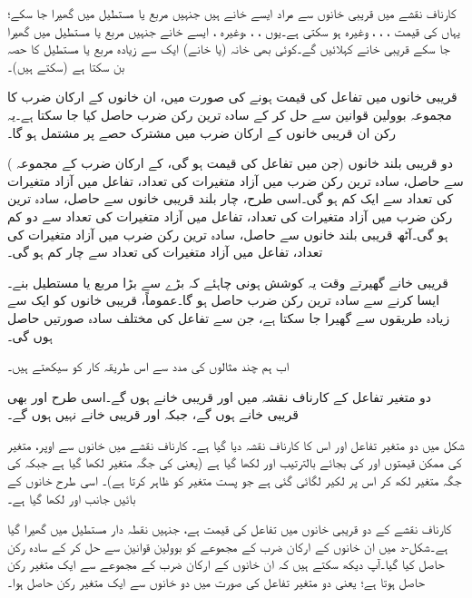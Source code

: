 کارناف نقشے میں قریبی خانوں سے مراد ایسے  خانے ہیں جنہیں مربع یا مستطیل میں گھیرا جا سکے؛ یہاں  کی قیمت ، ، ، وغیرہ ہو سکتی ہے۔یوں ، ، ،وغیرہ ، ایسے خانے جنہیں مربع یا مستطیل میں گھیرا جا سکے قریبی خانے کہلائیں گے۔کوئی بھی خانہ (یا خانے) ایک سے زیادہ مربع یا مستطیل کا حصہ بن سکتا ہے (سکتے ہیں)۔

قریبی خانوں میں تفاعل کی قیمت  ہونے کی صورت میں، ان خانوں کے ارکان ضرب کا مجموعہ بوولین قوانین سے حل کر کے سادہ ترین رکن ضرب حاصل کیا جا سکتا ہے۔یہ رکن ان قریبی خانوں کے ارکان ضرب میں مشترک حصے پر مشتمل ہو گا۔

دو قریبی بلند خانوں (جن میں تفاعل کی قیمت  ہو گی، کے ارکان ضرب کے مجموعہ ) سے حاصل، سادہ ترین رکن ضرب میں آزاد متغیرات کی تعداد، تفاعل میں آزاد متغیرات کی تعداد سے ایک کم ہو گی۔اسی طرح، چار بلند قریبی خانوں سے حاصل، سادہ ترین رکن ضرب میں آزاد متغیرات کی تعداد، تفاعل میں آزاد متغیرات کی تعداد سے دو کم ہو گی۔آٹھ قریبی بلند خانوں سے حاصل، سادہ ترین رکن ضرب میں آزاد متغیرات کی تعداد، تفاعل میں آزاد متغیرات کی تعداد سے چار کم ہو گی۔
	
قریبی خانے گھیرتے وقت یہ کوشش ہونی چاہئے کہ بڑے سے بڑا مربع یا مستطیل بنے۔ایسا کرنے سے سادہ ترین رکن ضرب حاصل ہو گا۔عموماً، قریبی خانوں کو ایک سے زیادہ طریقوں سے گھیرا جا سکتا ہے، جن سے تفاعل کی مختلف سادہ صورتیں حاصل ہوں گی۔
	
اب ہم چند مثالوں کی مدد سے اس طریقہ کار کو سیکھتے ہیں۔
	

دو متغیر تفاعل کے کارناف نقشہ میں  اور  قریبی خانے ہوں گے۔اسی طرح  اور  بھی قریبی خانے ہوں گے، جبکہ  اور  قریبی خانے نہیں ہوں گے۔

شکل  میں دو متغیر تفاعل اور اس کا کارناف نقشہ دیا گیا ہے۔ کارناف نقشے میں خانوں سے اوپر، متغیر  کی ممکن قیمتوں  اور  کی بجائے بالترتیب  اور  لکھا گیا ہے (یعنی  کی جگہ متغیر لکھا گیا ہے جبکہ  کی جگہ متغیر لکھ کر اس پر لکیر لگائی گئی ہے جو پست متغیر کو ظاہر کرتا ہے)۔ اسی طرح خانوں کے بائیں جانب  اور  لکھا گیا ہے۔

 کارناف نقشے کے دو قریبی خانوں میں تفاعل کی قیمت  ہے، جنہیں نقطہ دار مستطیل میں گھیرا گیا ہے۔شکل-د میں ان خانوں کے ارکان ضرب کے مجموعے کو بوولین قوانین سے حل کر کے سادہ رکن حاصل کیا گیا۔آپ دیکھ سکتے ہیں کہ ان خانوں کے ارکان ضرب کے مجموعے سے ایک متغیر رکن حاصل ہوتا ہے؛ یعنی دو متغیر تفاعل کی صورت میں دو خانوں سے ایک متغیر رکن حاصل ہوا۔

